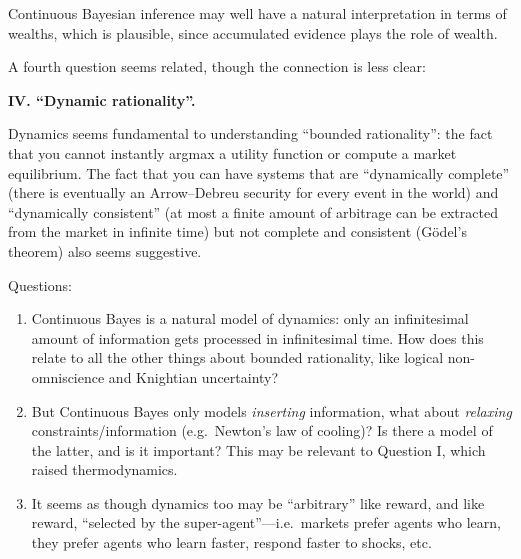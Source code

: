 \begin{subappendices}
Continuous Bayesian inference may well have a natural interpretation in terms of wealths,
which is plausible, since accumulated evidence plays the role of wealth.

A fourth question seems related, though the connection is less clear:

\textbf{IV. ``Dynamic rationality''.}

Dynamics seems fundamental to understanding ``bounded rationality'': the
fact that you cannot instantly argmax a utility function or compute a market equilibrium.
The fact that you can have systems that are ``dynamically complete'' (there is eventually an
Arrow--Debreu security for every event in the world) and ``dynamically consistent'' (at most
a finite amount of arbitrage can be extracted from the market in infinite time) but not
complete and consistent (G\"odel's theorem) also seems suggestive.

Questions:
\begin{enumerate}
  \item Continuous Bayes is a natural model of dynamics: only an infinitesimal
  amount of information gets processed in infinitesimal time. How does this relate to all
  the other things about bounded rationality, like logical non-omniscience and Knightian
  uncertainty?
  \item But Continuous Bayes only models \emph{inserting} information, what about
  \emph{relaxing} constraints/information (e.g.\ Newton's law of cooling)? Is there a model
  of the latter, and is it important? This may be relevant to Question I, which raised
  thermodynamics.
  \item It seems as though dynamics too may be ``arbitrary'' like reward, and like reward,
  ``selected by the super-agent''---i.e.\ markets prefer agents who learn, they prefer
  agents who learn faster, respond faster to shocks, etc.
\end{enumerate}

\end{subappendices}
